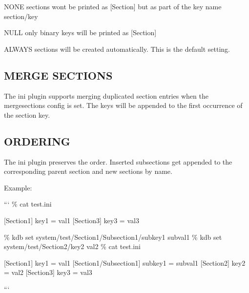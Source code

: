 \begin{DoxyItemize}
\item {\ttfamily N\+O\+N\+E} sections wont be printed as {\ttfamily \mbox{[}Section\mbox{]}} but as part of the key name {\ttfamily section/key}
\item {\ttfamily N\+U\+L\+L} only binary keys will be printed as {\ttfamily \mbox{[}Section\mbox{]}}
\item {\ttfamily A\+L\+W\+A\+Y\+S} sections will be created automatically. This is the default setting.
\end{DoxyItemize}

\subsection*{M\+E\+R\+G\+E S\+E\+C\+T\+I\+O\+N\+S}

The ini plugin supports merging duplicated section entries when the {\ttfamily mergesections} config is set. The keys will be appended to the first occurrence of the section key.

\subsection*{O\+R\+D\+E\+R\+I\+N\+G}

The ini plugin preserves the order. Inserted subsections get appended to the corresponding parent section and new sections by name.

Example\+:

``` \% cat test.\+ini

\mbox{[}Section1\mbox{]} key1 = val1 \mbox{[}Section3\mbox{]} key3 = val3

\% kdb set system/test/\+Section1/\+Subsection1/subkey1 subval1 \% kdb set system/test/\+Section2/key2 val2 \% cat test.\+ini

\mbox{[}Section1\mbox{]} key1 = val1 \mbox{[}Section1/\+Subsection1\mbox{]} subkey1 = subval1 \mbox{[}Section2\mbox{]} key2 = val2 \mbox{[}Section3\mbox{]} key3 = val3

``` 